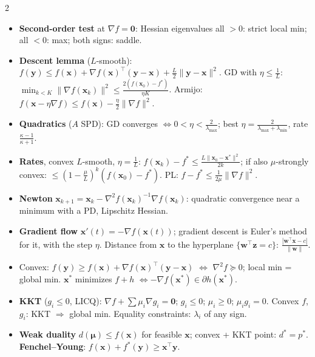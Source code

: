 \documentclass[10pt]{article}
\newcommand{\norm}[1]{\lVert #1 \rVert}
\newcommand{\topic}[1]{\par\smallskip\noindent{\color{blue!50!black}\textbf{#1}}\par\nopagebreak}
\begin{document}
\begin{multicols}{2}
\topic{Optimization}
\begin{itemize}
    \item \textbf{Second-order test} at $\nabla f = \mathbf{0}$: Hessian eigenvalues all $> 0$: strict local min; all $< 0$: max; both signs: saddle.
    \item \textbf{Descent lemma} ($L$-smooth): $f(\mathbf{y}) \leq f(\mathbf{x}) + \nabla f(\mathbf{x})^\top(\mathbf{y} - \mathbf{x}) + \frac{L}{2}\norm{\mathbf{y} - \mathbf{x}}^2$. GD with $\eta \leq \frac{1}{L}$: $\min_{k < K}\norm{\nabla f(\mathbf{x}_k)}^2 \leq \frac{2(f(\mathbf{x}_0) - f^*)}{\eta K}$. Armijo: $f(\mathbf{x} - \eta\nabla f) \leq f(\mathbf{x}) - \frac{\eta}{2}\norm{\nabla f}^2$.
    \item \textbf{Quadratics} ($A$ SPD): GD converges $\iff 0 < \eta < \frac{2}{\lambda_{\max}}$; best $\eta = \frac{2}{\lambda_{\max} + \lambda_{\min}}$, rate $\frac{\kappa - 1}{\kappa + 1}$.
    \item \textbf{Rates}, convex $L$-smooth, $\eta = \frac{1}{L}$: $f(\mathbf{x}_k) - f^* \leq \frac{L\norm{\mathbf{x}_0 - \mathbf{x}^*}^2}{2k}$; if also $\mu$-strongly convex: $\leq (1 - \frac{\mu}{L})^k(f(\mathbf{x}_0) - f^*)$. PL: $f - f^* \leq \frac{1}{2\mu}\norm{\nabla f}^2$.
    \item \textbf{Newton} $\mathbf{x}_{k+1} = \mathbf{x}_k - \nabla^2 f(\mathbf{x}_k)^{-1}\nabla f(\mathbf{x}_k)$: quadratic convergence near a minimum with a PD, Lipschitz Hessian.
    \item \textbf{Gradient flow} $\mathbf{x}'(t) = -\nabla f(\mathbf{x}(t))$; gradient descent is Euler's method for it, with the step $\eta$. Distance from $\mathbf{x}$ to the hyperplane $\{\mathbf{w}^\top\mathbf{z} = c\}$: $\frac{|\mathbf{w}^\top\mathbf{x} - c|}{\norm{\mathbf{w}}}$.
    \item Convex: $f(\mathbf{y}) \geq f(\mathbf{x}) + \nabla f(\mathbf{x})^\top(\mathbf{y} - \mathbf{x})$ $\iff$ $\nabla^2 f \succeq 0$; local min = global min. $\mathbf{x}^*$ minimizes $f + h$ $\iff -\nabla f(\mathbf{x}^*) \in \partial h(\mathbf{x}^*)$.
    \item \textbf{KKT} ($g_i \leq 0$, LICQ): $\nabla f + \sum\mu_i\nabla g_i = \mathbf{0}$; $g_i \leq 0$; $\mu_i \geq 0$; $\mu_ig_i = 0$. Convex $f$, $g_i$: KKT $\Rightarrow$ global min. Equality constraints: $\lambda_i$ of any sign.
    \item \textbf{Weak duality} $d(\boldsymbol\mu) \leq f(\mathbf{x})$ for feasible $\mathbf{x}$; convex + KKT point: $d^* = p^*$. \textbf{Fenchel--Young}: $f(\mathbf{x}) + f^*(\mathbf{y}) \geq \mathbf{x}^\top\mathbf{y}$.
\end{itemize}


\end{multicols}
\end{document}
